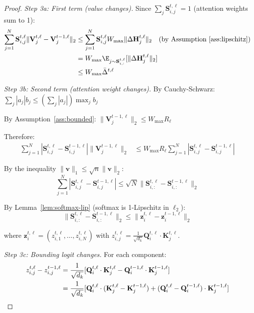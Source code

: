 \documentclass{article} %
\theoremstyle{definition}
\theoremstyle{remark}
\begin{document}
\begin{proof}
\textit{Step 3a: First term (value changes).}
Since $\sum_j \mathbf{S}^{t,\ell}_{i,j} = 1$ (attention weights sum to 1):
\begin{align}
\sum_{j=1}^N \mathbf{S}^{t,\ell}_{i,j} \|\mathbf{V}^{t,\ell}_j - \mathbf{V}^{t-1,\ell}_j\|_2 &\leq \sum_{j=1}^N \mathbf{S}^{t,\ell}_{i,j} W_{\max} \|\Delta\mathbf{H}^{t,\ell}_j\|_2 \quad \text{(by Assumption~\ref{ass:lipschitz})}\notag\\
&= W_{\max} \E_{j \sim \mathbf{S}^{t,\ell}_{i,:}}[\|\Delta\mathbf{H}^{t,\ell}_j\|_2]\notag\\
&\leq W_{\max} \bar{\Delta}^{t,\ell}
\end{align}

\textit{Step 3b: Second term (attention weight changes).}
By Cauchy-Schwarz: $\sum_j |a_j| b_j \leq (\sum_j |a_j|) \max_j b_j$

By Assumption~\ref{ass:bounded}: $\|\mathbf{V}^{t-1,\ell}_j\|_2 \leq W_{\max} R_\ell$

Therefore:
\begin{align}
\sum_{j=1}^N |\mathbf{S}^{t,\ell}_{i,j} - \mathbf{S}^{t-1,\ell}_{i,j}| \|\mathbf{V}^{t-1,\ell}_j\|_2 &\leq W_{\max} R_\ell \sum_{j=1}^N |\mathbf{S}^{t,\ell}_{i,j} - \mathbf{S}^{t-1,\ell}_{i,j}|
\end{align}

By the inequality $\|\mathbf{v}\|_1 \leq \sqrt{n}\|\mathbf{v}\|_2$:
\begin{equation}
\sum_{j=1}^N |\mathbf{S}^{t,\ell}_{i,j} - \mathbf{S}^{t-1,\ell}_{i,j}| \leq \sqrt{N} \|\mathbf{S}^{t,\ell}_{i,:} - \mathbf{S}^{t-1,\ell}_{i,:}\|_2
\end{equation}

By Lemma~\ref{lem:softmax-lip} (softmax is 1-Lipschitz in $\ell_2$):
\begin{equation}
\|\mathbf{S}^{t,\ell}_{i,:} - \mathbf{S}^{t-1,\ell}_{i,:}\|_2 \leq \|\mathbf{z}^{t,\ell}_i - \mathbf{z}^{t-1,\ell}_i\|_2
\end{equation}

where $\mathbf{z}^{t,\ell}_i = (z^{t,\ell}_{i,1}, \ldots, z^{t,\ell}_{i,N})$ with $z^{t,\ell}_{i,j} = \frac{1}{\sqrt{d_k}}\mathbf{Q}^{t,\ell}_i \cdot \mathbf{K}^{t,\ell}_j$.

\textit{Step 3c: Bounding logit changes.}
For each component:
\begin{align}
z^{t,\ell}_{i,j} - z^{t-1,\ell}_{i,j} &= \frac{1}{\sqrt{d_k}}[\mathbf{Q}^{t,\ell}_i \cdot \mathbf{K}^{t,\ell}_j - \mathbf{Q}^{t-1,\ell}_i \cdot \mathbf{K}^{t-1,\ell}_j]\notag\\
&= \frac{1}{\sqrt{d_k}}[\mathbf{Q}^{t,\ell}_i \cdot (\mathbf{K}^{t,\ell}_j - \mathbf{K}^{t-1,\ell}_j) + (\mathbf{Q}^{t,\ell}_i - \mathbf{Q}^{t-1,\ell}_i) \cdot \mathbf{K}^{t-1,\ell}_j]
\end{align}


\end{proof}
\end{document}
